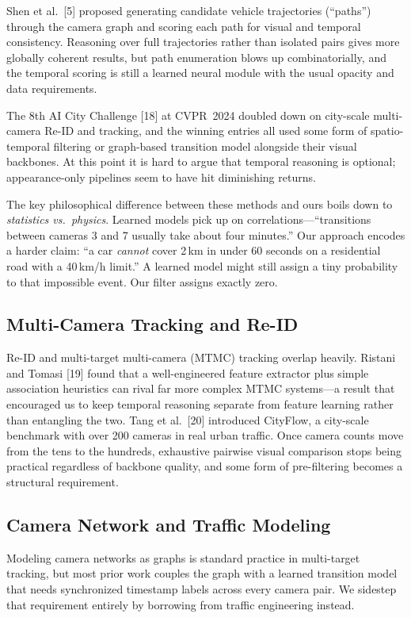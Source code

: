 \documentclass{ijitcs}
\begin{document}
Shen et al.\ [5] proposed generating candidate vehicle trajectories (``paths'') through the camera graph and scoring each path for visual and temporal consistency. Reasoning over full trajectories rather than isolated pairs gives more globally coherent results, but path enumeration blows up combinatorially, and the temporal scoring is still a learned neural module with the usual opacity and data requirements.

The 8th AI City Challenge [18] at CVPR~2024 doubled down on city-scale multi-camera Re-ID and tracking, and the winning entries all used some form of spatio-temporal filtering or graph-based transition model alongside their visual backbones. At this point it is hard to argue that temporal reasoning is optional; appearance-only pipelines seem to have hit diminishing returns.

The key philosophical difference between these methods and ours boils down to \textit{statistics vs.\ physics}. Learned models pick up on correlations---``transitions between cameras 3 and 7 usually take about four minutes.'' Our approach encodes a harder claim: ``a car \textit{cannot} cover 2\,km in under 60 seconds on a residential road with a 40\,km/h limit.'' A learned model might still assign a tiny probability to that impossible event. Our filter assigns exactly zero.

\subsection{Multi-Camera Tracking and Re-ID}
Re-ID and multi-target multi-camera (MTMC) tracking overlap heavily. Ristani and Tomasi [19] found that a well-engineered feature extractor plus simple association heuristics can rival far more complex MTMC systems---a result that encouraged us to keep temporal reasoning separate from feature learning rather than entangling the two. Tang et al.\ [20] introduced CityFlow, a city-scale benchmark with over 200 cameras in real urban traffic. Once camera counts move from the tens to the hundreds, exhaustive pairwise visual comparison stops being practical regardless of backbone quality, and some form of pre-filtering becomes a structural requirement.

\subsection{Camera Network and Traffic Modeling}
Modeling camera networks as graphs is standard practice in multi-target tracking, but most prior work couples the graph with a learned transition model that needs synchronized timestamp labels across every camera pair. We sidestep that requirement entirely by borrowing from traffic engineering instead.
\end{document}

